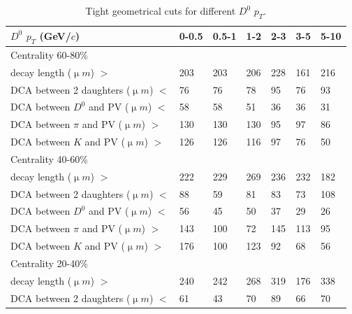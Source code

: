 \begin{table}[htp]
  \centering
  \caption{Tight geometrical cuts for different $D^0$ $p_T$.}
  \label{geometryCutsTight}
  \begin{center}
    \begin{tabular}{l|l|l|l|l|l|l}
      $D^0$ $p_T$ (GeV/$c$) & 0-0.5 & 0.5-1 & 1-2 & 2-3 & 3-5 & 5-10\\ \hline
      Centrality  60-80\% & &  & &  & & \\ \hline
      decay length (${\upmu}m$) $>$ & 203 & 203 & 206 & 228 & 161 & 216\\ \hline
      DCA between 2 daughters (${\upmu}m$) $<$ & 76 & 76 & 78 & 95 & 76 & 93\\ \hline
      DCA between $D^0$ and PV (${\upmu}m$) $<$ & 58 & 58 & 51 & 36 & 36 & 31\\ \hline
      DCA between $\pi$ and PV (${\upmu}m$) $>$ & 130 & 130 & 130 & 95 & 97 & 86\\ \hline
      DCA between $K$ and PV (${\upmu}m$) $>$ & 126 & 126 & 116 & 97 & 76 & 50\\ \hline
      Centrality  40-60\% &  &  &  &  & & \\ \hline
      decay length (${\upmu}m$) $>$ & 222 & 229 & 269 & 236 & 232 & 182\\ \hline
      DCA between 2 daughters (${\upmu}m$) $<$ & 88 & 59 & 81 & 83 & 73 & 108\\ \hline
      DCA between $D^0$ and PV (${\upmu}m$) $<$ & 56 & 45 & 50 & 37 & 29 & 26\\ \hline
      DCA between $\pi$ and PV (${\upmu}m$) $>$ & 143 & 100 & 72 & 145 & 113 & 95\\ \hline
      DCA between $K$ and PV (${\upmu}m$) $>$ & 176 & 100 & 123 & 92 & 68 & 56\\ \hline
      Centrality  20-40\% &  &  &  &  & & \\ \hline
      decay length (${\upmu}m$) $>$ & 240 & 242 & 268 & 319 & 176 & 338\\ \hline
      DCA between 2 daughters (${\upmu}m$) $<$ & 61 & 43 & 70 & 89 & 66 & 70\\ \hline

\end{tabular}
\end{center}
\end{table}
